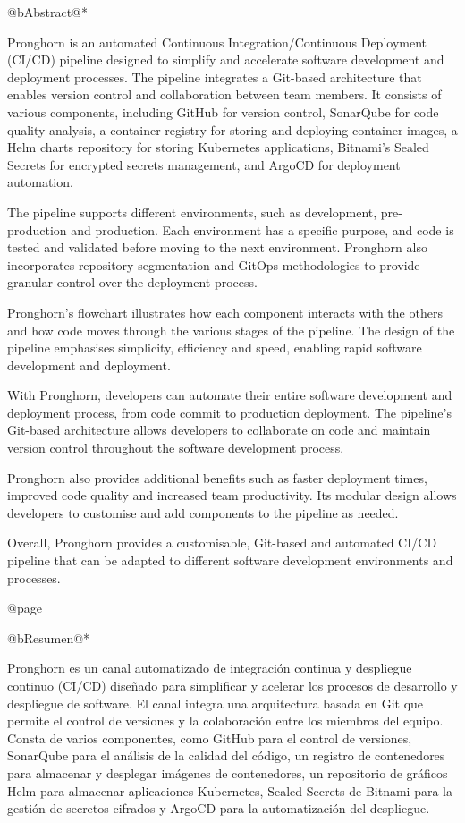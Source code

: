 @b{Abstract}@*

Pronghorn is an automated Continuous Integration/Continuous Deployment (CI/CD) pipeline designed to simplify and accelerate software development and deployment processes. The pipeline integrates a Git-based architecture that enables version control and collaboration between team members. It consists of various components, including GitHub for version control, SonarQube for code quality analysis, a container registry for storing and deploying container images, a Helm charts repository for storing Kubernetes applications, Bitnami's Sealed Secrets for encrypted secrets management, and ArgoCD for deployment automation.

The pipeline supports different environments, such as development, pre-production and production. Each environment has a specific purpose, and code is tested and validated before moving to the next environment. Pronghorn also incorporates repository segmentation and GitOps methodologies to provide granular control over the deployment process.

Pronghorn's flowchart illustrates how each component interacts with the others and how code moves through the various stages of the pipeline. The design of the pipeline emphasises simplicity, efficiency and speed, enabling rapid software development and deployment.

With Pronghorn, developers can automate their entire software development and deployment process, from code commit to production deployment. The pipeline's Git-based architecture allows developers to collaborate on code and maintain version control throughout the software development process.

Pronghorn also provides additional benefits such as faster deployment times, improved code quality and increased team productivity. Its modular design allows developers to customise and add components to the pipeline as needed.

Overall, Pronghorn provides a customisable, Git-based and automated CI/CD pipeline that can be adapted to different software development environments and processes.

@page

@b{Resumen}@*

Pronghorn es un canal automatizado de integración continua y despliegue continuo (CI/CD) diseñado para simplificar y acelerar los procesos de desarrollo y despliegue de software. El canal integra una arquitectura basada en Git que permite el control de versiones y la colaboración entre los miembros del equipo. Consta de varios componentes, como GitHub para el control de versiones, SonarQube para el análisis de la calidad del código, un registro de contenedores para almacenar y desplegar imágenes de contenedores, un repositorio de gráficos Helm para almacenar aplicaciones Kubernetes, Sealed Secrets de Bitnami para la gestión de secretos cifrados y ArgoCD para la automatización del despliegue.

